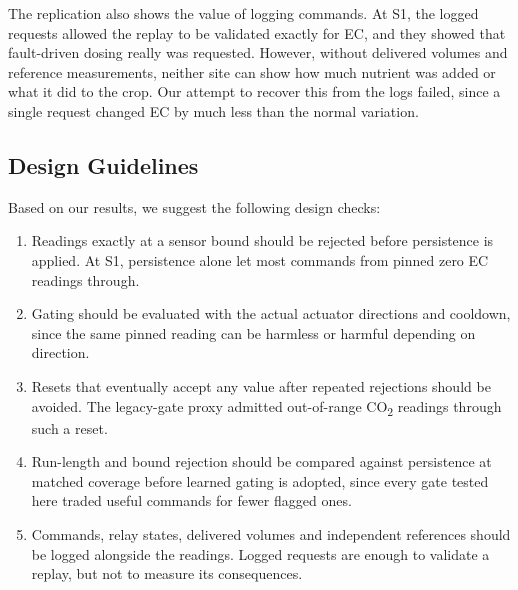 \documentclass[preprint,12pt,doubleblind]{elsarticle}
\newcommand{\COtwo}{CO\textsubscript{2}}
\begin{document}
The replication also shows the value of logging commands. At S1, the logged requests allowed the replay to be validated exactly for EC, and they showed that fault-driven dosing really was requested. However, without delivered volumes and reference measurements, neither site can show how much nutrient was added or what it did to the crop. Our attempt to recover this from the logs failed, since a single request changed EC by much less than the normal variation.

\subsection{Design Guidelines}
Based on our results, we suggest the following design checks:
\begin{enumerate}
\item Readings exactly at a sensor bound should be rejected before persistence is applied. At S1, persistence alone let most commands from pinned zero EC readings through.
\item Gating should be evaluated with the actual actuator directions and cooldown, since the same pinned reading can be harmless or harmful depending on direction.
\item Resets that eventually accept any value after repeated rejections should be avoided. The legacy-gate proxy admitted out-of-range \COtwo{} readings through such a reset.
\item Run-length and bound rejection should be compared against persistence at matched coverage before learned gating is adopted, since every gate tested here traded useful commands for fewer flagged ones.
\item Commands, relay states, delivered volumes and independent references should be logged alongside the readings. Logged requests are enough to validate a replay, but not to measure its consequences.
\end{enumerate}
\end{document}
